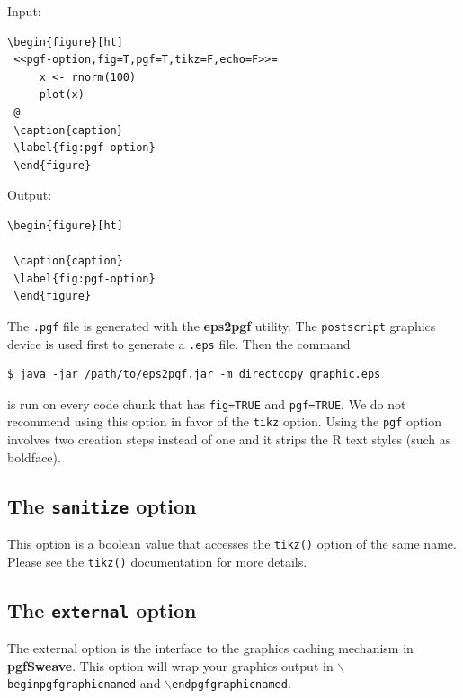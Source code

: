 \documentclass{article}
\newcommand{\lang}{\textsf}
\newcommand{\code}{\texttt}
\newcommand{\pkg}{\textbf}
\begin{document}
\begin{minipage}[!ht]{.5\linewidth}
Input:
\begin{Verbatim}[frame=single]
 \begin{figure}[ht]
 <<pgf-option,fig=T,pgf=T,tikz=F,echo=F>>=
     x <- rnorm(100)
     plot(x)
 @  
 \caption{caption}
 \label{fig:pgf-option}
 \end{figure}
\end{Verbatim}
\end{minipage}
\begin{minipage}[!ht]{.5\linewidth}
Output:
\begin{Verbatim}[frame=single]
 \begin{figure}[ht]
 
 \caption{caption}
 \label{fig:pgf-option}
 \end{figure}
\end{Verbatim}
\end{minipage}

\vspace{.5cm}

The \code{.pgf} file is generated with the \pkg{eps2pgf} utility. The \code{postscript} graphics device is used first to generate a \code{.eps} file.  Then the command \begin{verbatim}$ java -jar /path/to/eps2pgf.jar -m directcopy graphic.eps\end{verbatim} is run on every code chunk that has \code{fig=TRUE} and \code{pgf=TRUE}.  We do not  recommend using this option in favor of the \code{tikz} option.  Using the \code{pgf} option  involves two creation steps instead of one and it strips the \lang{R} text styles (such as boldface).

\subsection{The \code{sanitize} option}

This option is a boolean value that accesses the \code{tikz()} option of the same name.  Please see the \code{tikz()} documentation for more details. 

\subsection{The \code{external} option}

The external option is the interface to the graphics caching mechanism in \pkg{pgfSweave}. This option will wrap your graphics output in \code{$\backslash$beginpgfgraphicnamed} and \code{$\backslash$endpgfgraphicnamed}.
\end{document}

